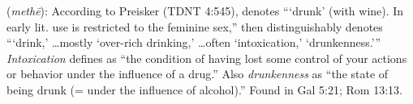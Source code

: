 \item[Drunkenness,]

(\textit{methē}):
According to Preisker (TDNT 4:545),  denotes ```drunk' (with wine). In early lit. use is restricted to the feminine sex,'' then  distinguishably denotes ```drink,' \ldots mostly `over-rich drinking,' \ldots often `intoxication,' `drunkenness.'''  \emph{Intoxication} defines as ``the condition of having lost some control of your actions or behavior under the influence of a drug.'' Also \emph{drunkenness}  as ``the state of being drunk (= under the influence of alcohol).''
Found in Gal 5:21; Rom 13:13.
